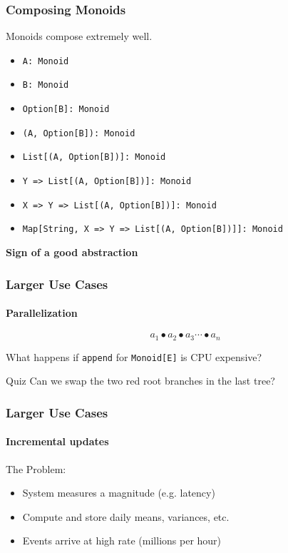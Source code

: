\documentclass{beamer}
\begin{document}
\begin{frame}
  \frametitle{Composing Monoids}
  Monoids compose extremely well.
  \begin{itemize}
    \item \texttt{A: Monoid}
    \item \texttt{B: Monoid}
      \pause
    \item \texttt{Option[B]: Monoid}
      \pause
    \item \texttt{(A, Option[B]): Monoid}
    \item \texttt{List[(A, Option[B])]: Monoid}
      \pause
    \item \texttt{Y => List[(A, Option[B])]: Monoid}
      \pause
    \item \texttt{X => Y => List[(A, Option[B])]: Monoid}
    \item \texttt{Map[String, X => Y => List[(A, Option[B])]]: Monoid}
  \end{itemize}
  \begin{block}{}
    \centering
    \Large \textbf{Sign of a good abstraction}
  \end{block}
\end{frame}

\begin{frame}
  \frametitle{Larger Use Cases}
  \framesubtitle{Parallelization}
  \[a_1 \bullet a_2 \bullet a_3 \dotsb \bullet a_n\]

  What happens if \texttt{append} for \texttt{Monoid[E]} is CPU expensive?

\pause


\begin{block}{Quiz}
  Can we swap the two red root branches in the last tree?
\end{block}

\end{frame}

\begin{frame}
  \frametitle{Larger Use Cases}
  \framesubtitle{Incremental updates}
  The Problem:

  \begin{itemize}
    \item System measures a magnitude (e.g. latency)
    \item Compute and store daily means, variances, etc.
    \item Events arrive at high rate (millions per hour)
  \end{itemize}


\end{frame}
\end{document}
